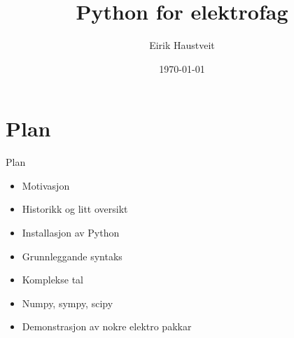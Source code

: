 \documentclass[10pt,a4paper]{beamer}
\title{Python for elektrofag}
\date{\today}
\author{Eirik Haustveit}
\institute{Institutt for datateknologi, elektroteknologi og realfag}
\begin{document}
	
	\titlepage

	\section{Plan}

	\begin{frame}{Plan}
		
          \begin{itemize}
                        \item Motivasjon
			\item Historikk og litt oversikt
                        \item Installasjon av Python
                        \item Grunnleggande syntaks
                        \item Komplekse tal
                        \item Numpy, sympy, scipy
			\item Demonstrasjon av nokre elektro pakkar
		\end{itemize}
		
	\end{frame}


	
	
	
	
		

    

    

    

    

    
    
    
    
    

	
	
	
	
\end{document}
